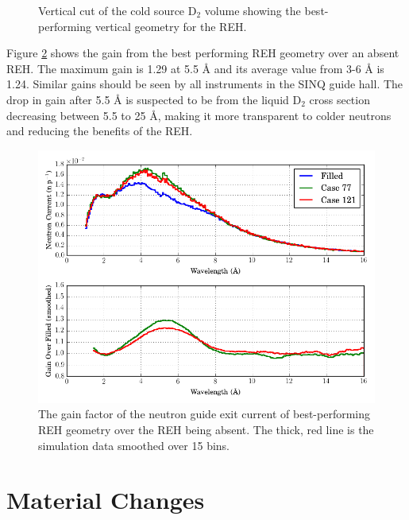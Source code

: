 \documentclass[preprint,12pt]{elsarticle}
\begin{document}
\begin{figure}[h]
\begin{minipage}{11pc}
\begin{center}
\end{center}
\caption{\label{case_vert}Vertical cut of the cold source D$_2$ volume showing the best-performing vertical geometry for the REH.}
\end{minipage} 
\end{figure} 

Figure \ref{parametric_gain} shows the gain from the best performing REH geometry over an absent REH.  The maximum gain is 1.29 at 5.5 \AA{} and its average value from 3-6 \AA{} is 1.24.  Similar gains should be seen by all instruments in the SINQ guide hall.  The drop in gain after 5.5 \AA{} is suspected to be from the liquid D$_2$ cross section decreasing between 5.5 to 25 \AA{}, making it more transparent to colder neutrons and reducing the benefits of the REH.

\begin{figure}
\begin{center}
\includegraphics[scale=0.45,trim={0cm 0cm 0cm 0cm},clip]{graphics/gains_geom.png}
\end{center}
\caption{\label{parametric_gain}The gain factor of the neutron guide exit current of best-performing REH geometry over the REH being absent.  The thick, red line is the simulation data smoothed over 15 bins.}
\end{figure}

\section{Material Changes}
\end{document}
